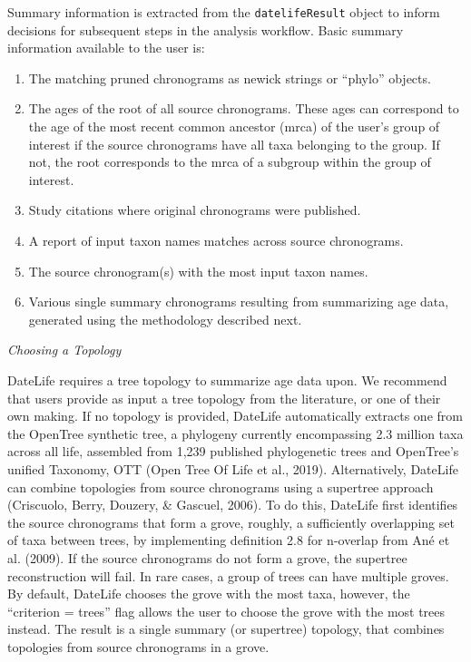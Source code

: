 \documentclass[english,man]{apa6}
\providecommand{\tightlist}{%
  \setlength{\itemsep}{0pt}\setlength{\parskip}{0pt}}
\begin{document}
Summary information is extracted from the \texttt{datelifeResult} object to inform decisions for subsequent steps in the analysis workflow. Basic summary information available to the user is:

\begin{enumerate}
\def\labelenumi{\arabic{enumi}.}
\tightlist
\item
  The matching pruned chronograms as newick strings or \enquote{phylo} objects.
\item
  The ages of the root of all source chronograms. These ages can correspond to the age of the most recent common ancestor (mrca) of the user's group of interest if the source chronograms have all taxa belonging to the group. If not, the root corresponds to the mrca of a subgroup within the group of interest.
\item
  Study citations where original chronograms were published.
\item
  A report of input taxon names matches across source chronograms.
\item
  The source chronogram(s) with the most input taxon names.
\item
  Various single summary chronograms resulting from summarizing age data, generated using the methodology described next.
\end{enumerate}

\begin{center}
\emph{Choosing a Topology}
\end{center}

DateLife requires a tree topology to summarize age data upon.
We recommend that users provide as input a tree topology from the literature, or one of their own making. If no topology is provided, DateLife automatically extracts one from the OpenTree synthetic tree, a phylogeny currently encompassing 2.3 million taxa across all life, assembled from 1,239 published phylogenetic trees and OpenTree's unified Taxonomy, OTT (Open Tree Of Life et al., 2019).
Alternatively, DateLife can combine topologies from source chronograms using a supertree approach (Criscuolo, Berry, Douzery, \& Gascuel, 2006).
To do this, DateLife first identifies the source chronograms that form a grove, roughly, a sufficiently overlapping set of taxa between trees, by implementing definition 2.8 for n-overlap from Ané et al. (2009).
If the source chronograms do not form a grove, the supertree reconstruction will fail.
In rare cases, a group of trees can have multiple groves. By default, DateLife chooses the grove with the most taxa, however, the \enquote{criterion = trees} flag allows the user to choose the grove with the most trees instead.
The result is a single summary (or supertree) topology, that combines topologies from source chronograms in a grove.
\end{document}
